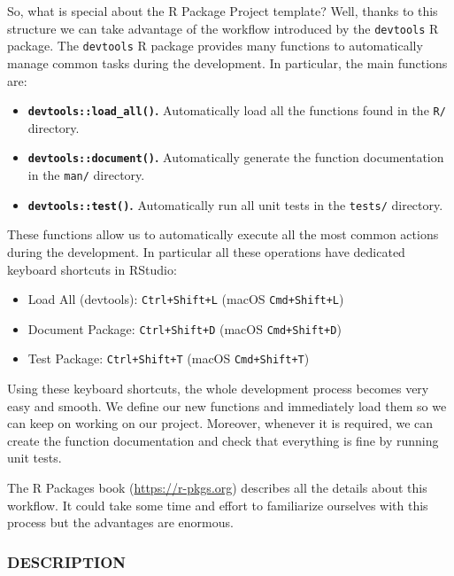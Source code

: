 \documentclass[
  11pt,
]{book}
\providecommand{\tightlist}{%
  \setlength{\itemsep}{0pt}\setlength{\parskip}{0pt}}
\begin{document}
So, what is special about the R Package Project template? Well, thanks to this structure we can take advantage of the workflow introduced by the \texttt{devtools} R package. The \texttt{devtools} R package provides many functions to automatically manage common tasks during the development. In particular, the main functions are:

\begin{itemize}
\tightlist
\item
  \textbf{\texttt{devtools::load\_all()}.} Automatically load all the functions found in the \texttt{R/} directory.
\item
  \textbf{\texttt{devtools::document()}.} Automatically generate the function documentation in the \texttt{man/} directory.
\item
  \textbf{\texttt{devtools::test()}.} Automatically run all unit tests in the \texttt{tests/} directory.
\end{itemize}

These functions allow us to automatically execute all the most common actions during the development. In particular all these operations have dedicated keyboard shortcuts in RStudio:

\begin{itemize}
\tightlist
\item
  Load All (devtools): \texttt{Ctrl+Shift+L} (macOS \texttt{Cmd+Shift+L})
\item
  Document Package: \texttt{Ctrl+Shift+D} (macOS \texttt{Cmd+Shift+D})
\item
  Test Package: \texttt{Ctrl+Shift+T} (macOS \texttt{Cmd+Shift+T})
\end{itemize}

Using these keyboard shortcuts, the whole development process becomes very easy and smooth. We define our new functions and immediately load them so we can keep on working on our project. Moreover, whenever it is required, we can create the function documentation and check that everything is fine by running unit tests.

The R Packages book (\url{https://r-pkgs.org}) describes all the details about this workflow. It could take some time and effort to familiarize ourselves with this process but the advantages are enormous.

\hypertarget{description}{%
\subsubsection{DESCRIPTION}\label{description}}
\end{document}
